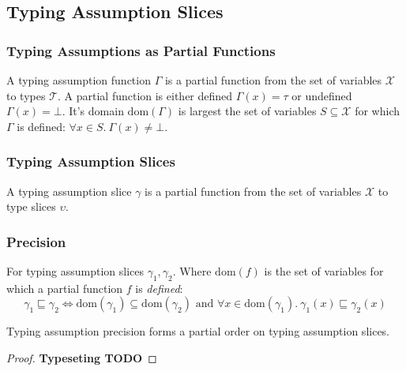 \subsection{Typing Assumption Slices}
\subsubsection{Typing Assumptions as Partial Functions}
\begin{definition}
A typing assumption function $\Gamma$ is a partial function from the set of variables $\mathcal{X}$ to types $\mathcal{T}$. A partial function is either defined $\Gamma(x) = \tau$ or undefined $\Gamma(x) = \bot$. It's domain $\mathrm{dom}(\Gamma)$ is largest the set of variables $S \subseteq \mathcal{X}$ for which $\Gamma$ is defined: $\forall x \in S.\ \Gamma(x) \neq \bot$.
\end{definition}

\subsubsection{Typing Assumption Slices}
\begin{definition}
A typing assumption slice $\gamma$ is a partial function from the set of variables $\mathcal{X}$ to type slices $\upsilon$.
\end{definition}
\subsubsection{Precision}
\begin{definition}
For typing assumption slices $\gamma_1, \gamma_2$. Where $\mathrm{dom}(f)$ is the set of variables for which a partial function $f$ is \textit{defined}:
\[\gamma_1 \sqsubseteq \gamma_2 \iff \mathrm{dom}(\gamma_1) \subseteq \mathrm{dom}(\gamma_2) \text{ and } \forall x \in  \mathrm{dom}(\gamma_1).\ \gamma_1(x) \sqsubseteq \gamma_2(x)\]
\end{definition}
\begin{proposition}
Typing assumption precision forms a partial order on typing assumption slices.
\end{proposition}
\begin{proof}
\textbf{Typeseting TODO}
\end{proof}
